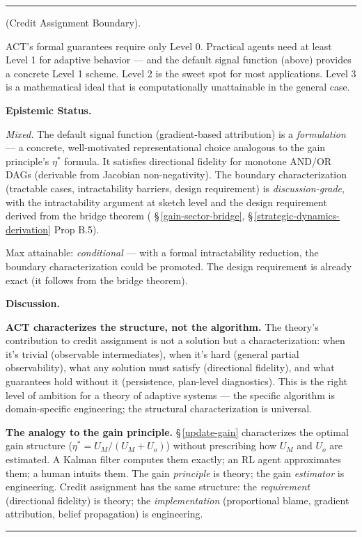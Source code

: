 \documentclass[11pt,oneside]{article}
\newcounter{claim}[section]
\renewcommand{\theclaim}{\thesection.\arabic{claim}}
\newenvironment{segment}[2]{%
  \refstepcounter{claim}%
  \bigskip\noindent\hrule\smallskip
  \noindent{\bfseries #1~\theclaim}\enskip(#2).\par\smallskip
  \noindent\ignorespaces
}{%
  \par\smallskip\noindent\hrule\bigskip
}
\newenvironment{discussion}[1][]{\begin{segment}{Discussion}{#1}}{\end{segment}}
\begin{document}
\begin{discussion}[Credit Assignment Boundary]
ACT's formal guarantees require only Level 0. Practical agents need at least Level 1 for adaptive behavior — and the default signal function (above) provides a concrete Level 1 scheme. Level 2 is the sweet spot for most applications. Level 3 is a mathematical ideal that is computationally unattainable in the general case.


\medskip\noindent\textbf{Epistemic Status.}


\textit{Mixed.} The default signal function (gradient-based attribution) is a \textit{formulation} — a concrete, well-motivated representational choice analogous to the gain principle's $\eta^*$ formula. It satisfies directional fidelity for monotone AND/OR DAGs (derivable from Jacobian non-negativity). The boundary characterization (tractable cases, intractability barriers, design requirement) is \textit{discussion-grade}, with the intractability argument at sketch level and the design requirement derived from the bridge theorem ( \S\,\ref{gain-sector-bridge}, \S\,\ref{strategic-dynamics-derivation} Prop B.5).

Max attainable: \textit{conditional} — with a formal intractability reduction, the boundary characterization could be promoted. The design requirement is already exact (it follows from the bridge theorem).


\medskip\noindent\textbf{Discussion.}


\textbf{ACT characterizes the structure, not the algorithm.} The theory's contribution to credit assignment is not a solution but a characterization: when it's trivial (observable intermediates), when it's hard (general partial observability), what any solution must satisfy (directional fidelity), and what guarantees hold without it (persistence, plan-level diagnostics). This is the right level of ambition for a theory of adaptive systems — the specific algorithm is domain-specific engineering; the structural characterization is universal.

\textbf{The analogy to the gain principle.} \S\,\ref{update-gain} characterizes the optimal gain structure ($\eta^* = U_M/(U_M + U_o)$) without prescribing how $U_M$ and $U_o$ are estimated. A Kalman filter computes them exactly; an RL agent approximates them; a human intuits them. The gain \textit{principle} is theory; the gain \textit{estimator} is engineering. Credit assignment has the same structure: the \textit{requirement} (directional fidelity) is theory; the \textit{implementation} (proportional blame, gradient attribution, belief propagation) is engineering.


\end{discussion}
\end{document}
